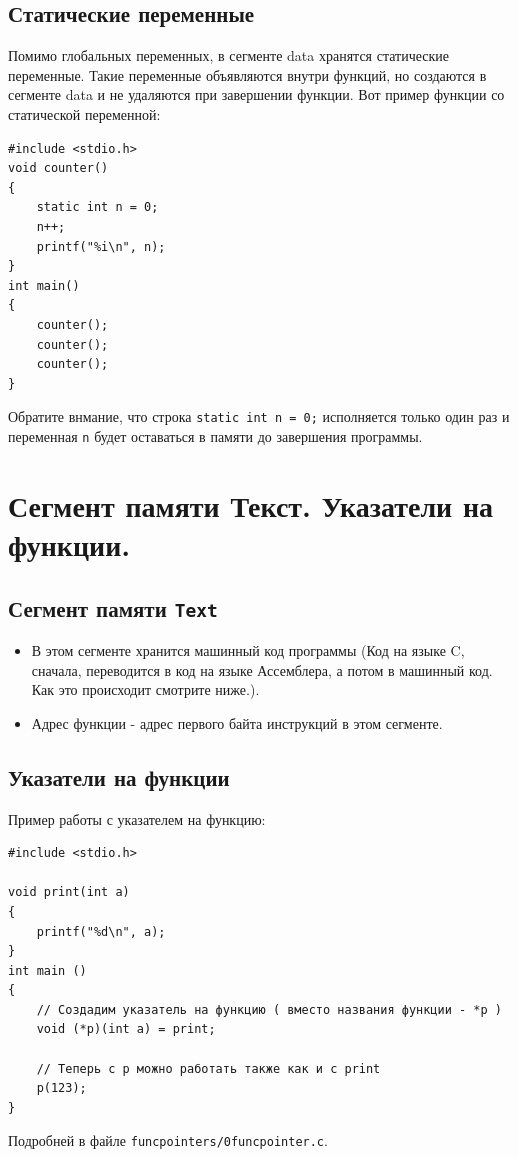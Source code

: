 \documentclass[10pt]{article}
\begin{document}
\subsection*{Статические переменные}
Помимо глобальных переменных, в сегменте data хранятся статические переменные. Такие переменные объявляются внутри функций, но создаются в сегменте data и не удаляются при завершении функции. Вот пример функции со статической переменной:
\begin{lstlisting}
#include <stdio.h>
void counter() 
{
    static int n = 0;
    n++;
    printf("%i\n", n);
}
int main() 
{
    counter();
    counter();
    counter();
}
\end{lstlisting}
Обратите внмание, что строка \texttt{static int n = 0;} исполняется только один раз и переменная \texttt{n} будет оставаться в памяти до завершения программы.



\newpage
\section*{Сегмент памяти Текст. Указатели на функции.}

\subsection*{Сегмент памяти \texttt{Text}}
\begin{itemize}
\item В этом сегменте хранится машинный код программы (Код на языке C, сначала, переводится в код на языке Ассемблера, а потом в машинный код. Как это происходит смотрите ниже.).
\item Адрес функции - адрес первого байта инструкций в этом сегменте.
\end{itemize}


\subsection*{Указатели на функции}
Пример работы с указателем на функцию:
\begin{lstlisting}
#include <stdio.h>

void print(int a)
{
    printf("%d\n", a);
}
int main ()
{
    // Создадим указатель на функцию ( вместо названия функции - *p )
    void (*p)(int a) = print;
    
    // Теперь с p можно работать также как и с print
    p(123);
}
\end{lstlisting}
Подробней в файле \texttt{funcpointers/0funcpointer.c}.
\end{document}
